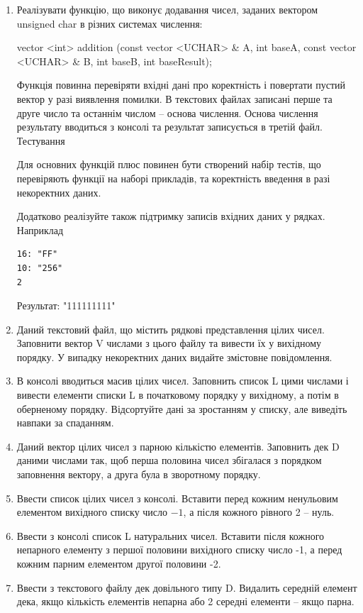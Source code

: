 \documentclass[a5paper,titlepage,openany,twoside,
]
{book_unv}%
\begin{document}
\begin{enumerate}
\begin{enumerate}
\begin{enumerate}
\item
Реалізувати функцію, що виконує додавання чисел, заданих вектором unsigned char
в різних системах числення:

vector <int> addition (const vector <UCHAR> \& A, int baseA,
                      const vector <UCHAR> \& B, int baseB, int baseResult);

Функція повинна перевіряти вхідні дані про коректність і повертати пустий вектор у разі виявлення помилки.
В текстових файлах записані перше та друге число та останнім числом -- основа числення.
Основа числення результату вводиться з консолі та результат записується в третій файл.
Тестування

Для основних функцій плюс повинен бути створений набір тестів, що перевіряють функції на наборі прикладів,
та коректність введення в разі некоректних даних.

Додатково реалізуйте також підтримку записів вхідних даних у рядках. Наприклад
\begin{verbatim}
16: "FF"
10: "256"
2
\end{verbatim}
Результат:
"111111111"

\item
Даний текстовий файл, що містить рядкові
представлення цілих чисел. Заповнити вектор V числами з цього файлу
та вивести їх у вихідному порядку. У випадку некоректних даних видайте
змістовне повідомлення.

\item
В консолі вводиться масив цілих чисел. Заповнить список L цими
числами і вивести елементи списки L в початковому порядку у вихідному, а
потім в оберненому порядку. Відсортуйте дані за зростанням у списку, але виведіть
навпаки за спаданням.

\item
Даний вектор цілих чисел з парною кількістю елементів.
Заповнить дек D даними числами так, щоб перша половина чисел збігалася
з порядком заповнення вектору, а друга була в зворотному порядку.
 
\item
Ввести список цілих чисел з консолі. Вставити перед кожним ненульовим
елементом вихідного списку число $-1$, а після кожного рівного 2 -- нуль.
\item
Ввести з консолі список L натуральних чисел. Вставити після
кожного непарного елементу з першої половини вихідного списку число -1, а
перед кожним парним елементом другої половини -2.
\item
Ввести з текстового файлу дек довільного типу D. Видалить середній елемент дека, якщо
кількість елементів непарна або 2 середні елементи -- якщо парна.


\end{enumerate}
\end{enumerate}
\end{enumerate}
\end{document}
